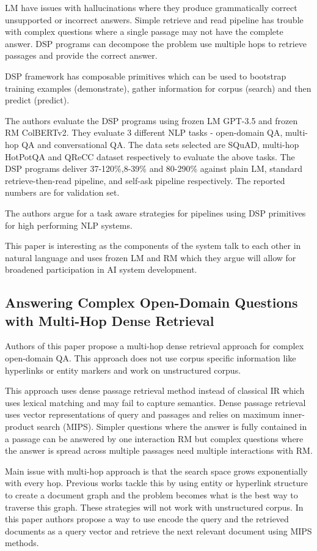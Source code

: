 \documentclass{article}
\begin{document}
LM have issues with hallucinations where they produce grammatically correct unsupported or incorrect answers. Simple retrieve and read pipeline has trouble with complex questions where a single passage may not have the complete answer. DSP programs can decompose the problem use multiple hops to retrieve passages and provide the correct answer.

DSP framework has composable primitives which can be used to bootstrap training examples (demonstrate), gather information for corpus (search) and then predict (predict). 

The authors evaluate the DSP programs using frozen LM GPT-3.5 and frozen RM ColBERTv2. They evaluate 3 different NLP tasks - open-domain QA, multi-hop QA and conversational QA. The data sets selected are SQuAD, multi-hop HotPotQA and QReCC dataset respectively to evaluate the above tasks. The DSP programs deliver 37-120\%,8-39\% and 80-290\% against plain LM, standard retrieve-then-read pipeline, and self-ask pipeline respectively. The reported numbers are for validation set.

The authors argue for a task aware strategies for pipelines using DSP primitives for high performing NLP systems.

This paper is interesting as the components of the system talk to each other in natural language and uses frozen LM and RM which they argue will allow for broadened participation in AI system development.

  \subsection{Answering Complex Open-Domain Questions with Multi-Hop Dense Retrieval \cite{https://doi.org/10.48550/arxiv.2009.12756}}
Authors of this paper propose a multi-hop dense retrieval approach for complex open-domain QA. This approach does not use corpus specific information like hyperlinks or entity markers and work on unstructured corpus. 

This approach uses dense passage retrieval method instead of classical IR which uses lexical matching and may fail to capture semantics. Dense passage retrieval uses vector representations of query and passages and relies on maximum inner-product search (MIPS). Simpler questions where the answer is fully contained in a passage can be answered by one interaction RM but complex questions where the answer is spread across multiple passages need multiple interactions with RM. 

Main issue with multi-hop approach is that the search space grows exponentially with every hop. Previous works tackle this by using entity or hyperlink structure to create a document graph and the problem becomes what is the best way to traverse this graph. These strategies will not work with unstructured corpus. In this paper authors propose a way to use encode the query and the retrieved documents as a query vector and retrieve the next relevant document using MIPS methods. 
\end{document}
